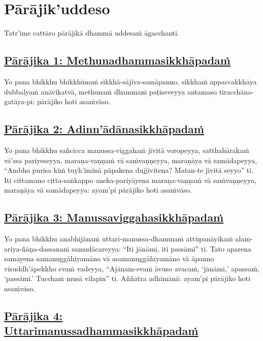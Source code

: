 \section{Pārājik'uddeso}
\label{par}

\begin{intro}
  Tatr'ime cattāro pārājikā dhammā uddesaṁ āgacchanti.
\end{intro}

\setsubsecheadstyle{\subsubsectionFmt}
\subsection*{\hyperref[disq1]{Pārājika 1: Methunadhammasikkhāpadaṁ}}
\label{par1}

Yo pana bhikkhu bhikkhūnaṁ sikkhā-sājīva-samāpanno, sikkhaṁ appaccakkhāya dubbalyaṁ anāvikatvā, methunaṁ dhammaṁ paṭiseveyya antamaso tiracchāna-gatāya-pi: pārājiko hoti asaṁvāso.

\subsection*{\hyperref[disq2]{Pārājika 2: Adinn'ādānasikkhāpadaṁ}}
\label{par2}

Yo pana bhikkhu sañcicca manussa-viggahaṁ jīvitā voropeyya, satthahārakaṁ vā'ssa pariyeseyya, maraṇa-vaṇṇaṁ vā saṁvaṇṇeyya, maraṇāya vā samādapeyya, “Ambho purisa kiṁ tuyh’iminā pāpakena dujjīvitena? Matan-te jīvitā seyyo” ti. Iti cittamano citta-saṅkappo aneka-pariyāyena maraṇa-vaṇṇaṁ vā saṁvaṇṇeyya, maraṇāya vā samādapeyya: ayam'pi pārājiko hoti asaṁvāso.

\subsection*{\hyperref[disq3]{Pārājika 3: Manussaviggahasikkhāpadaṁ}}
\label{par3}

Yo pana bhikkhu anabhijānaṁ uttari-manussa-dhammaṁ attūpanāyikaṁ alam-ariya-ñāṇa-dassanaṁ samudācareyya: “Iti jānāmi, iti passāmī” ti. Tato aparena samayena samanuggāhiyamāno vā asamanuggāhiyamāno vā āpanno visuddh’āpekkho evaṁ vadeyya, “Ajānam-evaṁ āvuso avacaṁ, ‘jānāmi,’ apassaṁ, ‘passāmi.’ Tucchaṁ musā vilapin” ti. Aññatra adhimānā: ayam'pi pārājiko hoti asaṁvāso.

\subsection*{\hyperref[disq4]{Pārājika 4: Uttarimanussadhammasikkhāpadaṁ}}
\label{par4}

